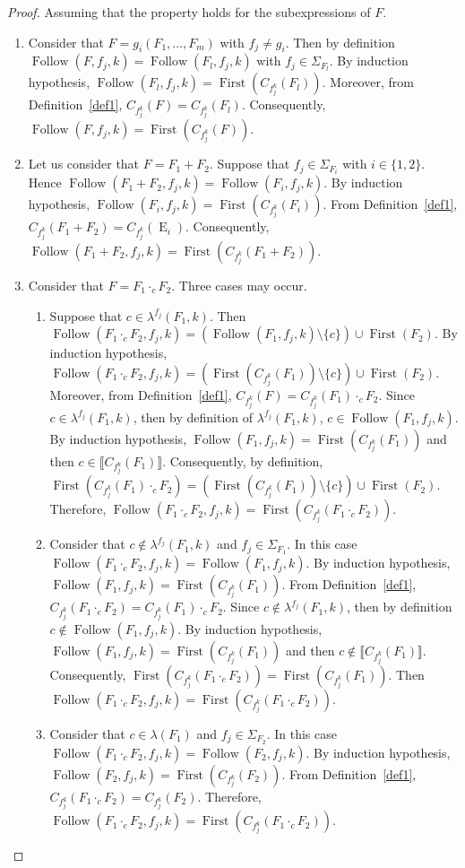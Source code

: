 \documentclass{llncs}
\DeclareMathOperator{\E}{E}
\DeclareMathOperator{\First}{First}
\DeclareMathOperator{\Follow}{Follow}
\begin{document}
\begin{proof}
  Assuming that the property holds for the subexpressions 
of $F$. 
\begin{enumerate}
\item Consider that $F=g_i(F_1,\dots,F_m)$ with $f_j\neq g_i$. Then by definition $\Follow(F,f_j,k)=\Follow(F_l,f_j,k)$ with $f_j\in\Sigma_{F_l}$. By induction hypothesis, $\Follow(F_l,f_j,k)=\First(C_{f^k_j}(F_l))$. Moreover, from Definition~\ref{def1}, $C_{f^k_j}(F)=C_{f^k_j}(F_l)$. Consequently, $\Follow(F,f_j,k)=\First(C_{f^k_j}(F))$.
\item Let us consider that $F=F_1+F_2$. Suppose that $f_j\in\Sigma_{F_i}$ with $i\in\{1,2\}$. Hence $\Follow(F_1+F_2,f_j,k)=\Follow(F_i,f_j,k)$. By induction hypothesis, $\Follow(F_i,f_j,k)=\First(C_{f^k_j}(F_i))$. From Definition~\ref{def1}, $C_{f^k_j}(F_1+F_2)=C_{f^k_j}(\E_i)$. Consequently, $\Follow(F_1+F_2,f_j,k)=\First(C_{f^k_j}(F_1+F_2))$.
\item Consider that $F=F_1 \cdot_c F_2$. Three cases may occur.
   \begin{enumerate}
     \item Suppose that $c\in\lambda^{f_j}(F_1,k)$. Then $\Follow(F_1\cdot_cF_2,f_j,k)=(\Follow(F_1,f_j,k)\setminus\{c\}) \cup \First(F_2)$. By induction hypothesis, $\Follow(F_1\cdot_c F_2,f_j,k)=(\First(C_{f^k_j}(F_1)) \setminus\{c\}) \cup \First(F_2)$. Moreover, from Definition~\ref{def1}, $C_{f^k_j}(F)= C_{f^k_j}(F_1) \cdot_c F_2 $. Since $c\in\lambda^{f_j}(F_1,k)$, then by definition of $\lambda^{f_j}(F_1,k)$, $c \in \Follow(F_1,f_j,k)$. By induction hypothesis, $\Follow(F_1,f_j,k)=\First(C_{f^k_j}(F_1))$ and then $c \in \llbracket C_{f^k_j}(F_1)\rrbracket$. Consequently, by definition, $\First(C_{f^k_j}(F_1) \cdot_c F_2 )=(\First(C_{f^k_j}(F_1))\setminus\{c\}) \cup \First(F_2)$. Therefore, $\Follow(F_1\cdot_c F_2,f_j,k)=\First(C_{f^k_j}(F_1\cdot_c F_2))$. 
\item Consider that $c\notin\lambda^{f_j}(F_1,k)$ and $f_j\in\Sigma_{F_1}$. In this case $\Follow(F_1\cdot_c F_2,f_j,k)=\Follow(F_1,f_j,k)$. By induction hypothesis, $\Follow(F_1,f_j,k)=\First(C_{f^k_j}(F_1))$. From Definition~\ref{def1}, $C_{f^k_j}(F_1\cdot_c F_2)=C_{f^k_j}(F_1)\cdot_c F_2$. Since $c\notin\lambda^{f_j}(F_1,k)$, then by definition $c \notin \Follow(F_1,f_j,k)$. By induction hypothesis, $\Follow(F_1,f_j,k)=\First(C_{f^k_j}(F_1))$ and then $c \notin \llbracket C_{f^k_j}(F_1)\rrbracket$. Consequently, $\First(C_{f^k_j}(F_1\cdot_c F_2))=\First(C_{f^k_j}(F_1))$. Then $\Follow(F_1\cdot_c F_2,f_j,k)=\First(C_{f^k_j}(F_1\cdot_c F_2))$.      
\item Consider that $c\in\lambda(F_1)$ and $f_j\in\Sigma_{F_2}$. In this case $\Follow(F_1\cdot_c F_2,f_j,k)=\Follow(F_2,f_j,k)$. By induction hypothesis, $\Follow(F_2,f_j,k)=\First(C_{f^k_j}(F_2))$. From Definition~\ref{def1}, $C_{f^k_j}(F_1\cdot_c F_2)=C_{f^k_j}(F_2)$. Therefore, $\Follow(F_1\cdot_c F_2,f_j,k)=\First(C_{f^k_j}(F_1\cdot_c F_2))$. 

\end{enumerate}
\end{enumerate}
\end{proof}
\end{document}
